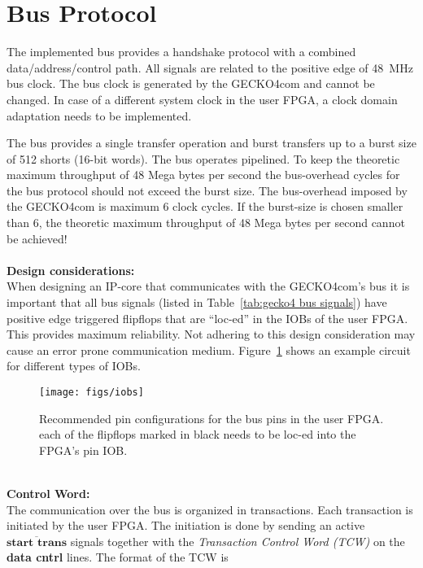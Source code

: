 \section{Bus Protocol}
\label{sec:bus prot}
The implemented bus provides a handshake protocol with a combined
data/address/control path. All signals are related to the positive edge of 48~MHz 
bus clock. The bus clock is generated by the {\sc GECKO4com} and cannot be
changed. In case of a different system clock in the user FPGA, a clock domain
adaptation needs to be implemented.

The bus provides a single transfer operation and burst transfers up to a burst
size of 512 shorts (16-bit words). The bus operates pipelined. To keep the
theoretic maximum throughput of 48 Mega bytes per second the bus-overhead cycles for
the bus protocol should not exceed the burst size. The bus-overhead imposed by
the {\sc GECKO4com} is maximum 6 clock cycles. If the burst-size is chosen
smaller than 6, the theoretic maximum throughput of 48 Mega bytes per second
cannot be achieved!\\
 \\
\textbf{Design considerations:}\\
When designing an IP-core that communicates with the {\sc GECKO4com}'s bus it is
important that all bus signals (listed in Table~\ref{tab:gecko4 bus signals})
have positive edge triggered flipflops that are ``{\sc loc}-ed'' in the IOBs of the
user FPGA. This provides maximum reliability. Not adhering to this design
consideration may cause an error prone communication medium. Figure~\ref{fig:iob loc bus}
shows an example circuit for different types of IOBs.\note \\
\begin{figure}
\texttt{[image: figs/iobs]}
\caption{Recommended pin configurations for the bus pins in the user FPGA. each
of the flipflops marked in black needs to be {\sc loc}-ed into the FPGA's pin IOB.}
\label{fig:iob loc bus}
\end{figure}
 \\
\textbf{Control Word:}\\
The communication over the bus is organized in transactions. Each transaction is
initiated by the user FPGA. The initiation is done by sending an active
$\overline{\textbf{start trans}}$ signals together with the \emph{Transaction
Control Word (TCW)} on the \textbf{data cntrl} lines. The format of the TCW is
